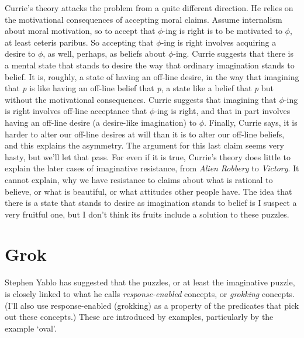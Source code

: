 Currie's theory attacks the problem from a quite different direction. He relies on the motivational consequences of accepting moral claims. Assume internalism about moral motivation, so to accept that ${\phi}${}-ing is right is to be motivated to ${\phi}$, at least ceteris paribus. So accepting that ${\phi}${}-ing is right involves acquiring a desire to ${\phi}$, as well, perhaps, as beliefs about ${\phi}${}-ing. Currie suggests that there is a mental state that stands to desire the way that ordinary imagination stands to belief. It is, roughly, a state of having an off-line desire, in the way that imagining that \textit{p} is like having an off-line belief that \textit{p}, a state like a belief that \textit{p} but without the motivational consequences. Currie suggests that imagining that ${\phi}${}-ing is right involves off-line acceptance that ${\phi}${}-ing is right, and that in part involves having an off-line desire (a desire-like imagination) to ${\phi}$. Finally, Currie says, it is harder to alter our off-line desires at will than it is to alter our off-line beliefs, and this explains the asymmetry. The argument for this last claim seems very hasty, but we'll let that pass. For even if it is true, Currie's theory does little to explain the later cases of imaginative resistance, from \textit{Alien} \textit{Robbery} to \textit{Victory}. It cannot explain, why we have resistance to claims about what is rational to believe, or what is beautiful, or what attitudes other people have. The idea that there is a state that stands to desire as imagination stands to belief is I suspect a very fruitful one, but I don't think its fruits include a solution to these puzzles.

\section{Grok}
Stephen Yablo has suggested that the puzzles, or at least the imaginative puzzle, is closely linked to what he calls \textit{response-enabled }concepts, or \textit{grokking }concepts. (I'll also use resp\-onse-enabled (grokking) as a property of the predicates that pick out these concepts.) These are introduced by examples, particularly by the example `oval'.

